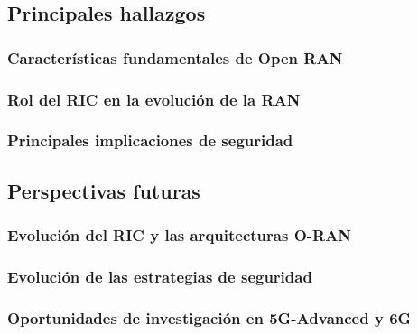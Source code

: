 \documentclass[11pt,a4paper]{article}
\makeatletter
\let\ORIGsubsection\subsection
\def\subsection{\@nobreakfalse\ORIGsubsection}
\let\ORIGsubsubsection\subsubsection
\def\subsubsection{\@nobreakfalse\ORIGsubsubsection}
\makeatother
\begin{document}
\subsection{Principales hallazgos}

\subsubsection{Características fundamentales de Open RAN}
\subsubsection{Rol del RIC en la evolución de la RAN}
\subsubsection{Principales implicaciones de seguridad}

\subsection{Perspectivas futuras}

\subsubsection{Evolución del RIC y las arquitecturas O-RAN}
\subsubsection{Evolución de las estrategias de seguridad}
\subsubsection{Oportunidades de investigación en 5G-Advanced y 6G}
\end{document}
